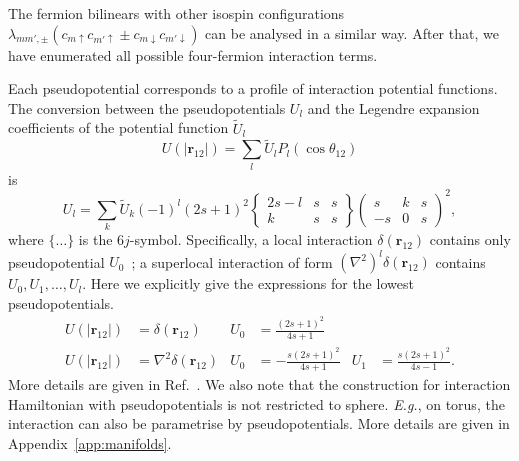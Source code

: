 \documentclass{timesjhep}
\begin{document}
The fermion bilinears with other isospin configurations $\lambda_{mm',\pm}(c_{m\uparrow}c_{m'\uparrow}\pm c_{m\downarrow}c_{m'\downarrow})$ can be analysed in a similar way. After that, we have enumerated all possible four-fermion interaction terms. 

Each pseudopotential corresponds to a profile of interaction potential functions. The conversion between the pseudopotentials $U_l$ and the Legendre expansion coefficients of the potential function $\tilde{U}_l$
\begin{equation}
    U(|\mathbf{r}_{12}|)=\sum_l\tilde{U}_lP_l(\cos\theta_{12})
\end{equation} 
is 
\begin{equation} 
    U_l=\sum_k \tilde{U}_k(-1)^l(2s+1)^2\begin{Bmatrix}2s-l&s&s\\k&s&s\end{Bmatrix}\begin{pmatrix}s&k&s\\-s&0&s\end{pmatrix}^2,
\end{equation}
where $\{\dots\}$ is the $6j$-symbol. Specifically, a local interaction $\delta(\mathbf{r}_{12})$ contains only pseudopotential $U_0$~; a superlocal interaction of form $(\nabla^2)^l\delta(\mathbf{r}_{12})$ contains $U_0,U_1,\dots,U_l$. Here we explicitly give the expressions for the lowest pseudopotentials. 
\begin{align}
    U(|\mathbf{r}_{12}|)&=\delta(\mathbf{r}_{12})&U_0&=\frac{(2s+1)^2}{4s+1}\nonumber\\
    U(|\mathbf{r}_{12}|)&=\nabla^2\delta(\mathbf{r}_{12})&U_0&=-\frac{s(2s+1)^2}{4s+1}&U_1&=\frac{s(2s+1)^2}{4s-1}.
\end{align}
More details are given in Ref.~\cite{Fan2024}. We also note that the construction for interaction Hamiltonian with pseudopotentials is not restricted to sphere. \textit{E.g.}, on torus, the interaction can also be parametrise by pseudopotentials. More details are given in Appendix~\ref{app:manifolds}.
\end{document}
